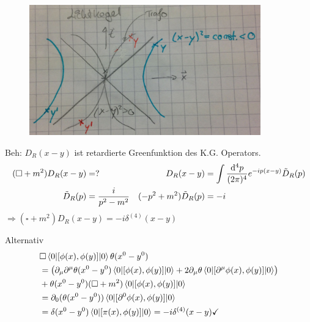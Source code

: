 	\begin{figure} [h]
		\begin{center}
			\includegraphics[width = 10cm]{Kausalitaet2}
		\end{center}	
	\end{figure}
\FloatBarrier
Beh: $D_R(x-y)$ ist retardierte Greenfunktion des K.G. Operators.
	\begin{align*}
		(\square + m^2) D_R(x-y) &= ? &
		D_R(x-y) &= \int \frac{\mathrm{d}^4 p}{(2 \pi)^4} e^{-ip(x-y)} \tilde{D}_R (p) \\
		\tilde{D}_R(p) &= \frac{i}{p^2 - m^2} & 
		(-p^2 + m^2) \tilde{D}_R(p) &= -i
	\end{align*}
$\Rightarrow (\square + m^2) D_R(x-y) = -i \delta^{(4)} (x-y)$

Alternativ
	\begin{align*}
		& \square \braket{0 | [\phi(x), \phi(y)] | 0} \theta(x^0 - y^0) \\
		&=
		\left(
			\partial_\mu \partial^\mu \theta(x^0 - y^0) \braket{0 | [\phi(x), \phi(y)] | 0} + 2 \partial_\mu \theta \braket{0 | [\partial^\mu \phi(x), \phi(y)] | 0}
		\right) \\
		&+ \theta(x^0 - y^0) (\square + m^2) \braket{0 | [\phi(x), \phi(y)] | 0} \\
		&= \partial_0 (\theta(x^0 -y^0)) \braket{0 | [\partial^0 \phi(x), \phi(y)] | 0} \\
		&= \delta(x^0 -y^0) \braket{0 | [\pi(x), \phi(y)] | 0} = -i \delta^{(4)}(x-y) \checkmark
	\end{align*}